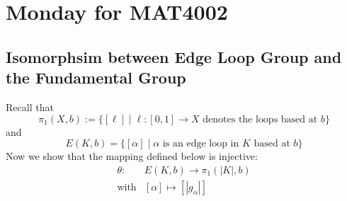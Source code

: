 \section{Monday for MAT4002}

\subsection{Isomorphsim between Edge Loop Group and the Fundamental Group}

Recall that 
\[
\pi_1(X,b):=\{[\ell]\mid \ell:[0,1]\to X\text{ denotes the loops based at $b$}\}
\]
and 
\[
E(K,b)=\{[\alpha]\mid \alpha\text{ is an edge loop in $K$ based at $b$}\}
\]
Now we show that the mapping defined below is injective:
\[
\begin{array}{ll}
\theta:&E(K,b)\to\pi_1(|K|,b)\\
\text{with}&[\alpha]\mapsto[|g_\alpha|]
\end{array}
\]
